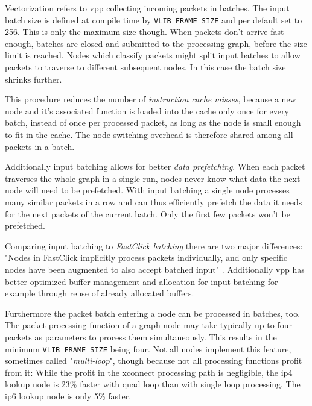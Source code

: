 Vectorization refers to \Ac{vpp} collecting incoming packets in
batches. The input batch size is defined at compile time by
\lstinline|VLIB_FRAME_SIZE| and per default set to 256. This is only
the maximum size though. When packets don't arrive fast enough,
batches are closed and submitted to the processing graph, before the
size limit is reached. Nodes which classify packets might split input
batches  to allow packets to traverse to different subsequent nodes.
In this case the batch size shrinks further.

This procedure reduces the number of \textit{instruction cache misses}, because
a new node and it's associated function is loaded into the cache only
once for every batch, instead of once per processed packet, as long as
the node is small enough to fit in the cache. The node switching
overhead is therefore shared among all packets in a batch.

Additionally input batching allows for better \textit{data prefetching}. When
each packet traverses the whole graph in a single run, nodes never
know what data the next node will need to be prefetched. With input
batching a single node processes many similar packets in a row and can
thus efficiently prefetch the data it needs for the next packets of
the current batch. Only the first few packets won't be prefetched.

Comparing input batching to \textit{FastClick batching} there are two major
differences: "Nodes in FastClick implicitly process packets
individually, and only specific nodes have been augmented to also
accept batched input" \cite{linguaglossa2017high}. Additionally
\Ac{vpp} has better optimized buffer management and allocation for
input batching for example through reuse of already allocated buffers.
\cite{linguaglossa2017high}

Furthermore the packet batch entering a node can be processed in
batches, too. The packet processing function of a graph node may take
typically up to four packets as parameters to process them
simultaneously. This results in the minimum
\lstinline|VLIB_FRAME_SIZE| being four. Not all nodes implement this
feature, sometimes called "\textit{multi-loop}", though because not
all processing functions profit from it: While the profit in the
xconnect processing path is negligible, the \Ac{ip4} lookup node is
23\% faster with quad loop than with single loop processing. The
\Ac{ip6} lookup node is only 5\% faster. \cite{linguaglossa2017high}



